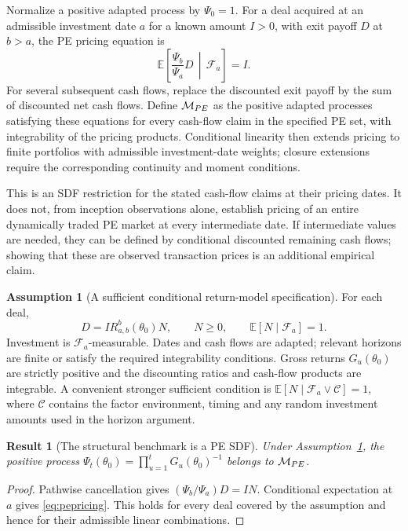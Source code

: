 \documentclass[11pt]{article}
\newcommand{\E}{\mathbb{E}}
\theoremstyle{plain}
\newtheorem{result}{Result}[section]
\theoremstyle{definition}
\newtheorem{assumption}{Assumption}
\begin{document}
Normalize a positive adapted process by $\Psi_0=1$. For a deal acquired at an admissible investment date $a$ for a known amount $I>0$, with exit payoff $D$ at $b>a$, the PE pricing equation is
\begin{equation}
\label{eq:pepricing}
\E\left[\frac{\Psi_b}{\Psi_a}D\,\middle|\,\mathcal F_a\right]=I.
\end{equation}
For several subsequent cash flows, replace the discounted exit payoff by the sum of discounted net cash flows. Define $\mathcal{M}_{PE}$ as the positive adapted processes satisfying these equations for every cash-flow claim in the specified PE set, with integrability of the pricing products. Conditional linearity then extends pricing to finite portfolios with admissible investment-date weights; closure extensions require the corresponding continuity and moment conditions.

This is an SDF restriction for the stated cash-flow claims at their pricing dates. It does not, from inception observations alone, establish pricing of an entire dynamically traded PE market at every intermediate date. If intermediate values are needed, they can be defined by conditional discounted remaining cash flows; showing that these are observed transaction prices is an additional empirical claim.

\begin{assumption}[A sufficient conditional return-model specification]
\label{ass:pepricing}
For each deal,
\[
D=I R^b_{a,b}(\theta_0)N,\qquad N\ge0,
\qquad \E[N\mid\mathcal F_a]=1.
\]
Investment is $\mathcal F_a$-measurable. Dates and cash flows are adapted; relevant horizons are finite or satisfy the required integrability conditions. Gross returns $G_u(\theta_0)$ are strictly positive and the discounting ratios and cash-flow products are integrable. A convenient stronger sufficient condition is $\E[N\mid\mathcal F_a\vee\mathcal C]=1$, where $\mathcal C$ contains the factor environment, timing and any random investment amounts used in the horizon argument.
\end{assumption}

\begin{result}[The structural benchmark is a PE SDF]
\label{res:pe_member}
Under Assumption~\ref{ass:pepricing}, the positive process
$\Psi_t(\theta_0)=\prod_{u=1}^tG_u(\theta_0)^{-1}$ belongs to $\mathcal{M}_{PE}$.
\end{result}
\begin{proof}
Pathwise cancellation gives $(\Psi_b/\Psi_a)D=IN$. Conditional expectation at $a$ gives \eqref{eq:pepricing}. This holds for every deal covered by the assumption and hence for their admissible linear combinations.
\end{proof}
\end{document}
